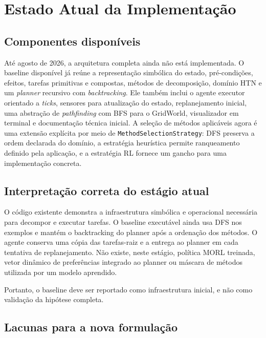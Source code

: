 \chapter{Estado Atual da Implementação}

\section{Componentes disponíveis}

Até agosto de 2026, a arquitetura completa ainda não está implementada.
O baseline disponível já reúne a representação simbólica do estado,
pré-condições, efeitos, tarefas primitivas e compostas, métodos de
decomposição, domínio HTN e um \textit{planner} recursivo com \textit{backtracking}.
Ele também inclui o agente executor orientado a \textit{ticks}, sensores para
atualização do estado, replanejamento inicial, uma abstração de \textit{pathfinding}
com BFS para o GridWorld, visualizador em terminal e documentação técnica
inicial.
A seleção de métodos aplicáveis agora é uma extensão explícita por
meio de \texttt{MethodSelectionStrategy}: DFS preserva a ordem declarada do
domínio, a estratégia heurística permite ranqueamento definido pela aplicação,
e a estratégia RL fornece um gancho para uma implementação concreta.

\section{Interpretação correta do estágio atual}

O código existente demonstra a infraestrutura simbólica e operacional
necessária para decompor e executar tarefas.
O baseline executável ainda usa DFS nos exemplos e mantém o backtracking do
planner após a ordenação dos métodos.
O agente conserva uma cópia das tarefas-raiz e a entrega ao planner em cada
tentativa de replanejamento.
Não existe, neste estágio, política MORL treinada, vetor dinâmico de
preferências integrado ao planner ou máscara de métodos utilizada por um
modelo aprendido.

Portanto, o baseline deve ser reportado como infraestrutura inicial, e não como
validação da hipótese completa.

\section{Lacunas para a nova formulação}

